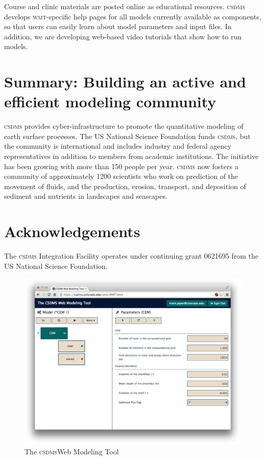 \documentclass[11pt, oneside]{amsart}
\DeclareRobustCommand{\csdms}{\textsc{csdms}}
\DeclareRobustCommand{\wmt}{\textsc{wmt}}
\begin{document}
Course and clinic materials are posted online as educational resources.
\csdms{} develops \wmt{}-specific help pages for all models currently
available as components, so that users can easily learn about model
parameters and input files. In addition, we are developing web-based video
tutorials that show how to run models.

\section{Summary: Building an active and efficient modeling community}

\csdms{} provides cyber-infrastructure to promote the quantitative modeling of
earth surface processes. The US National Science Foundation funds \csdms{}, but
the community is international and includes industry and federal agency
representatives in addition to members from academic institutions. The
initiative has been growing with more than 150 people per year. \csdms{} now
fosters a community of approximately 1200 scientists who work on prediction
of the movement of fluids, and the production, erosion, transport, and
deposition of sediment and nutrients in landscapes and seascapes. 

\section{Acknowledgements}

The \csdms{} Integration Facility operates under continuing grant 0621695
from the US National Science Foundation.

\begin{figure}
  \caption{The \csdms Web Modeling Tool}
  \begin{center}
    \includegraphics[scale=.25]{wmt.eps}
  \end{center}
  \label{fig:wmt_screenshot}
\end{figure}
\end{document}
